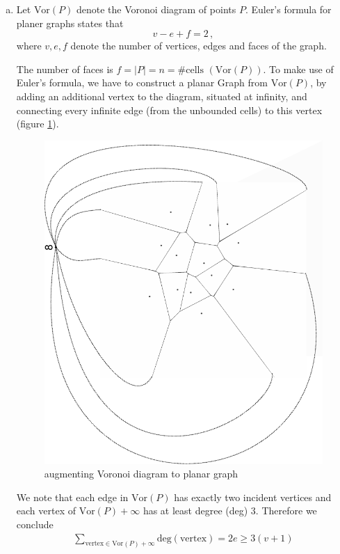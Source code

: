 \documentclass[10pt,a4paper,boxed]{hmcpset}
\newcommand{\Vor}[1]{\textrm{Vor}(#1)}
\begin{document}
\begin{solution}
\begin{enumerate}[(a)]
				\item Let $\Vor{P}$ denote the Voronoi diagram of points $P$. Euler's formula for planer graphs states that
				\[ v - e + f = 2\,, \] where $v, e, f$ denote the number of vertices, edges and faces of the graph.
				
				The number of faces is $ f = \vert P \vert = n = \#\textrm{cells } (\Vor{P})$. To make use of Euler's formula, we have to construct a planar Graph from $ \Vor{P} $, by adding an additional vertex to the diagram, situated at infinity, and connecting every infinite edge (from the unbounded cells) to this vertex (figure \ref{fig:VorGraph}).
				
				\begin{figure}[h]
    			\centering
    			\includegraphics[scale=0.3]{1b.pdf} 
    			\caption{augmenting Voronoi diagram to planar graph}
    			\label{fig:VorGraph}
				\end{figure} 
				
				We note that each edge in $ \Vor{P} $ has exactly two incident vertices and each vertex of $ \Vor{P}+\infty $ has at least degree (\textrm{deg}) $ 3 $. Therefore we conclude
				\begin{align}
					\sum_{\textrm{vertex} \in \Vor{P}+\infty} \textrm{deg}(\textrm{vertex})  = 2e \geq 3 (v + 1) \label{eq:1}
				\end{align}
								

\end{enumerate}
\end{solution}
\end{document}
